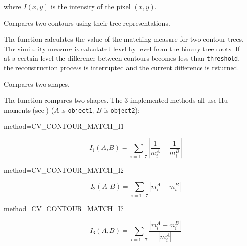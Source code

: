 where $I(x,y)$ is the intensity of the pixel $(x, y)$.

Compares two contours using their tree representations.


\begin{description}
\end{description}

The function calculates the value of the matching measure for two contour trees. The similarity measure is calculated level by level from the binary tree roots. If at a certain level the difference between contours becomes less than \texttt{threshold}, the reconstruction process is interrupted and the current difference is returned.

Compares two shapes.


\begin{description}
\end{description}

The function compares two shapes. The 3 implemented methods all use Hu moments (see ) ($A$ is \texttt{object1}, $B$ is \texttt{object2}):

\begin{description}
\item[method=CV\_CONTOUR\_MATCH\_I1]
\[ I_1(A,B) = \sum_{i=1...7} \left| \frac{1}{m^A_i} - \frac{1}{m^B_i} \right| \]

\item[method=CV\_CONTOUR\_MATCH\_I2]
\[ I_2(A,B) = \sum_{i=1...7} \left| m^A_i - m^B_i \right| \]

\item[method=CV\_CONTOUR\_MATCH\_I3]
\[ I_3(A,B) = \sum_{i=1...7} \frac{ \left| m^A_i - m^B_i \right| }{ \left| m^A_i \right| } \]
\end{description}

